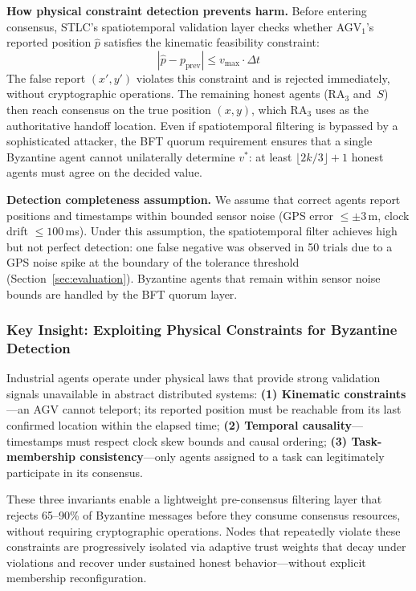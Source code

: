\documentclass[manuscript,screen,review]{acmart}
\begin{document}
\textbf{How physical constraint detection prevents harm.} Before entering consensus, STLC's spatiotemporal validation layer checks whether AGV$_1$'s reported position $\hat{p}$ satisfies the kinematic feasibility constraint:
\[
    |\hat{p} - p_{\text{prev}}| \leq v_{\max} \cdot \Delta t
\]
The false report $(x', y')$ violates this constraint and is rejected immediately, without cryptographic operations. The remaining honest agents (RA$_3$ and~$S$) then reach consensus on the true position $(x, y)$, which RA$_3$ uses as the authoritative handoff location. Even if spatiotemporal filtering is bypassed by a sophisticated attacker, the BFT quorum requirement ensures that a single Byzantine agent cannot unilaterally determine $v^*$: at least $\lfloor 2k/3 \rfloor + 1$ honest agents must agree on the decided value.

\textbf{Detection completeness assumption.} We assume that correct agents report positions and timestamps within bounded sensor noise (GPS error $\leq \pm 3$\,m, clock drift $\leq 100$\,ms). Under this assumption, the spatiotemporal filter achieves high but not perfect detection: one false negative was observed in 50 trials due to a GPS noise spike at the boundary of the tolerance threshold (Section~\ref{sec:evaluation}). Byzantine agents that remain within sensor noise bounds are handled by the BFT quorum layer.

\subsubsection{Key Insight: Exploiting Physical Constraints for Byzantine Detection}

Industrial agents operate under physical laws that provide strong validation signals unavailable in abstract distributed systems: \textbf{(1) Kinematic constraints}---an AGV cannot teleport; its reported position must be reachable from its last confirmed location within the elapsed time; \textbf{(2) Temporal causality}---timestamps must respect clock skew bounds and causal ordering; \textbf{(3) Task-membership consistency}---only agents assigned to a task can legitimately participate in its consensus.

These three invariants enable a lightweight pre-consensus filtering layer that rejects 65--90\% of Byzantine messages before they consume consensus resources, without requiring cryptographic operations. Nodes that repeatedly violate these constraints are progressively isolated via adaptive trust weights that decay under violations and recover under sustained honest behavior---without explicit membership reconfiguration.
\end{document}
